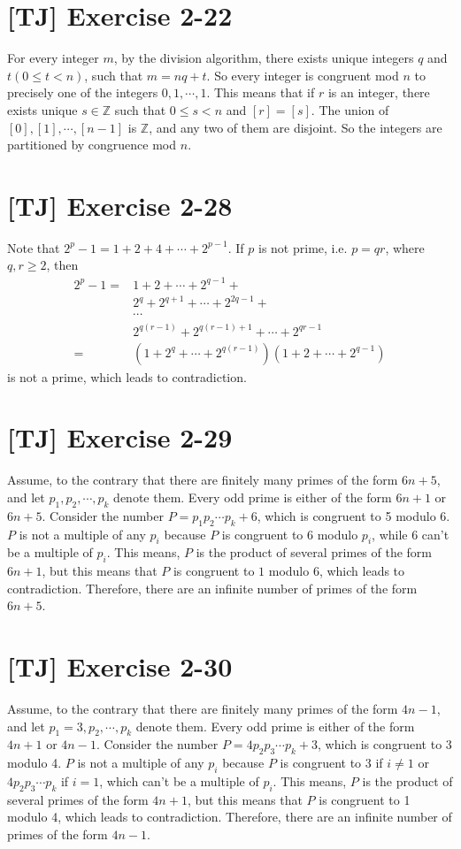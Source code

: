 \documentclass[a4paper,11pt,twocolumn]{article}
\begin{document}
  \section{[TJ] Exercise 2-22}
  For every integer $m$, by the division algorithm, there exists unique integers $q$ and $t (0 \leq t < n)$, such that $m = nq + t$. So every integer is congruent mod $n$ to precisely one of the integers $0, 1, \cdots, 1$. This means that if $r$ is an integer, there exists unique $s \in \mathbb{Z}$ such that $0 \leq s < n$ and $[r] = [s]$. The union of $[0], [1], \cdots, [n-1]$ is $\mathbb{Z}$, and any two of them are disjoint. So the integers are partitioned by congruence mod $n$.

  \section{[TJ] Exercise 2-28}
  Note that $2^p - 1 = 1 + 2 + 4 + \cdots + 2^{p-1}$. If $p$ is not prime, i.e. $p = qr$, where $q, r \geq 2$, then
  \begin{align*}
    2^p - 1 =& 1 + 2 + \cdots + 2^{q-1} + \\
             & 2^q + 2^{q+1} + \cdots + 2^{2q-1} + \\
             & \cdots \\
             & 2^{q(r-1)} + 2^{q(r-1)+1} + \cdots + 2^{qr-1} \\
            =& (1 + 2^q + \cdots + 2^{q(r-1)}) (1 + 2 + \cdots + 2^{q-1}) 
  \end{align*}
  is not a prime, which leads to contradiction.
  
  \section{[TJ] Exercise 2-29}
  Assume, to the contrary that there are finitely many primes of the form $6n+5$, and let $p_1, p_2, \cdots, p_k$ denote them. Every odd prime is either of the form $6n+1$ or $6n+5$. Consider the number $P = p_1p_2 \cdots p_k + 6$, which is congruent to 5 modulo 6. $P$ is not a multiple of any $p_i$ because $P$ is congruent to $6$ modulo $p_i$, while $6$ can't be a multiple of $p_i$. This means, $P$ is the product of several primes of the form $6n+1$, but this means that $P$ is congruent to $1$ modulo 6, which leads to contradiction. Therefore, there are an infinite number of primes of the form $6n+5$.
  
  \section{[TJ] Exercise 2-30}
  Assume, to the contrary that there are finitely many primes of the form $4n-1$, and let $p_1 = 3, p_2, \cdots, p_k$ denote them. Every odd prime is either of the form $4n+1$ or $4n-1$. Consider the number $P = 4p_2p_3 \cdots p_k + 3$, which is congruent to 3 modulo 4. $P$ is not a multiple of any $p_i$ because $P$ is congruent to 3 if $i \neq 1$ or $4p_2p_3 \cdots p_k$ if $i = 1$, which can't be a multiple of $p_i$. This means, $P$ is the product of several primes of the form $4n+1$, but this means that $P$ is congruent to 1 modulo 4, which leads to contradiction. Therefore, there are an infinite number of primes of the form $4n-1$.
\end{document}
